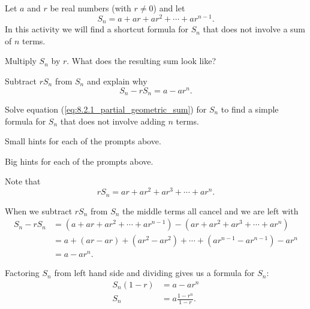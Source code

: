 \begin{activity} \label{8.2.Act1} Let $a$ and $r$ be real numbers (with $r \ne 0$) and let
\[S_n = a+ar+ar^2 + \cdots + ar^{n-1}.\]
In this activity we will find a shortcut formula for $S_n$ that does not involve a sum of $n$ terms.
\ba
\item Multiply $S_n$ by $r$. What does the resulting sum look like?


\item Subtract $rS_n$ from $S_n$ and explain why
\begin{equation} \label{eq:8.2.1_partial_geometric_sum}
S_n - rS_n = a - ar^n.
\end{equation}


\item Solve equation (\ref{eq:8.2.1_partial_geometric_sum}) for $S_n$ to find a simple formula for $S_n$ that does not involve adding $n$ terms.


\ea
\end{activity}

\begin{smallhint}
\ba
	\item Small hints for each of the prompts above.
\ea
\end{smallhint}
\begin{bighint}
\ba
	\item Big hints for each of the prompts above.
\ea
\end{bighint}
\begin{activitySolution}
\ba
	\item Note that
\[rS_n = ar+ar^2+ar^3 + \cdots + ar^n.\]
    \item When we subtract $rS_n$ from $S_n$ the middle terms all cancel and we are left with
\begin{align*}
S_n - rS_n &= \left(a+ar+ar^2 + \cdots + ar^{n-1}\right) - \left(ar+ar^2+ar^3 + \cdots + ar^n\right) \\
    &=a + (ar-ar) + \left(ar^2-ar^2\right) + \cdots + \left(ar^{n-1}-ar^{n-1}\right) - ar^n \\
    &= a - ar^n.
    \end{align*}
    \item Factoring $S_n$ from left hand side and dividing gives us a formula for $S_n$:
\begin{align*}
S_n(1-r) &= a - ar^n \\
S_n &= a\frac{1-r^n}{1-r}.
\end{align*}

\ea
\end{activitySolution}
\aftera 